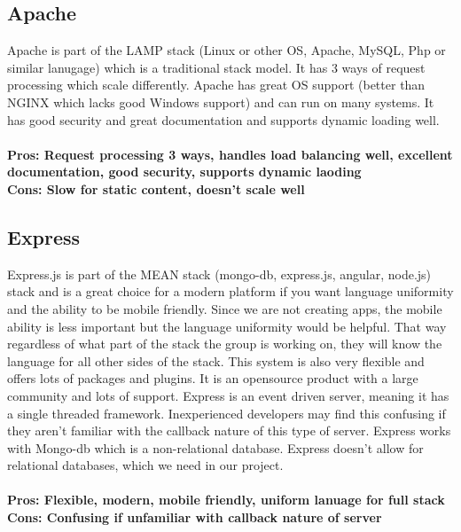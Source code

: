 \documentclass[draftclsnofoot,onecolumn,letterpaper,10pt,compsoc]{IEEEtran}
\begin{document}
			\subsection{Apache}
				Apache is part of the LAMP stack (Linux or other OS, Apache, MySQL, Php or similar lanugage) which is a traditional stack model\cite{UpWork}.
				It has 3 ways of request processing which scale differently.
				Apache has great OS support (better than NGINX which lacks good Windows support) and can run on many systems\cite{HostingAd}.
				It has good security and great documentation and supports dynamic loading well\cite{HostingAd}.
				\\ \\
				\textbf{Pros: Request processing 3 ways, handles load balancing well, excellent documentation, good security, supports dynamic laoding}
				\\
				\textbf{Cons: Slow for static content, doesn't scale well}


			\subsection{Express}
				Express.js is part of the MEAN stack (mongo-db, express.js, angular, node.js) stack and is a great choice for a modern platform if you want language uniformity and the ability to be mobile friendly\cite{UpWork}.
				Since we are not creating apps, the mobile ability is less important but the language uniformity would be helpful.
				That way regardless of what part of the stack the group is working on, they will know the language for all other sides of the stack.
				This system is also very flexible and offers lots of packages and plugins.
				It is an opensource product with a large community and lots of support\cite{JSSolutionsDev}.
				Express is an event  driven server, meaning it has a single threaded framework\cite{JSSolutionsDev}.
				Inexperienced developers may find this confusing if they aren't familiar with the callback nature of this type of server\cite{JSSolutionsDev}.
				Express works with Mongo-db which is a non-relational database. Express doesn’t allow for relational databases, which we need in our project.
				\\ \\
				\textbf{Pros: Flexible, modern, mobile friendly, uniform lanuage for full stack}
				\\
				\textbf{Cons: Confusing if unfamiliar with callback nature of server}
\end{document}
